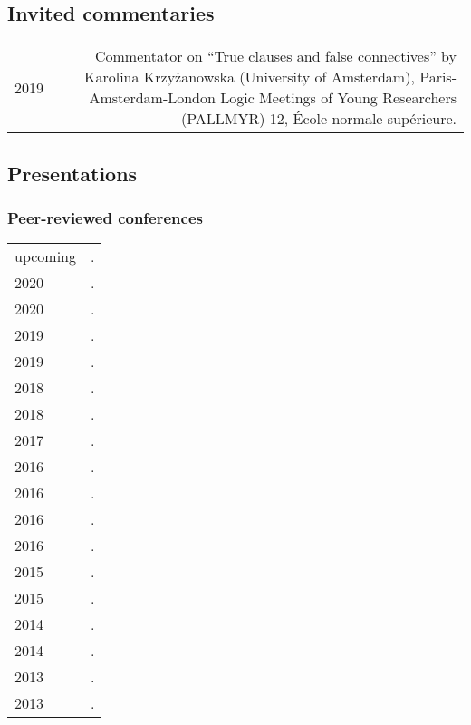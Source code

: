 \documentclass[12pt,letterpaper,twoside]{article}
\makeatletter
\newenvironment{cvsection}{%
  \begin{longtable}[l]{@{}L@{} @{}R@{}}
}{%
  \end{longtable}
}
\makeatother
\begin{document}
\subsection*{Invited commentaries}

\begin{cvsection}
  2019 & Commentator on ``True clauses and false connectives'' by Karolina Krzyżanowska (University of Amsterdam), Paris-Amsterdam-London Logic Meetings of Young Researchers (PALLMYR) 12, École normale supérieure.\\
\end{cvsection}

\subsection*{Presentations}

\subsubsection*{Peer-reviewed conferences}

\begin{cvsection}
  upcoming & .\\
  2020 & .\\
  2020 & .\\
  2019 & .\\
  2019 & .\\
  2018 & .\\
  2018 & .\\
  2017 & .\\
  2016 & .\\
  2016 & .\\
  2016 & .\\
  2016 & .\\
  2015 & .\\
  2015 & .\\
  2014 & .\\
  2014 & .\\
  2013 & .\\
  2013 & .\\
\end{cvsection}
\end{document}
